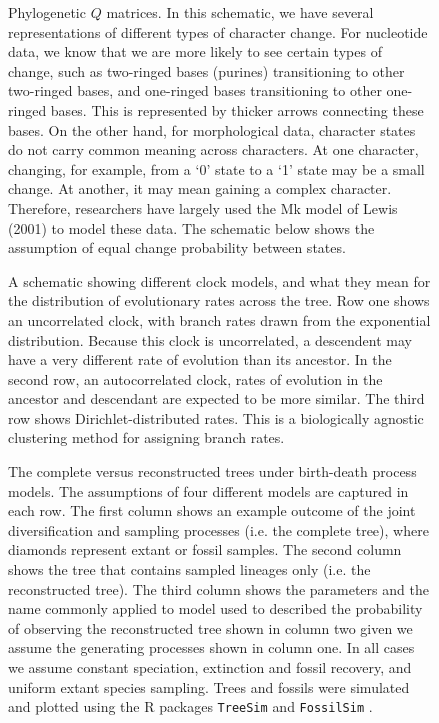 \documentclass{cup-elements}
\begin{document}
\begin{figure}[h!]
\centering
\caption{Phylogenetic $Q$ matrices.
In this schematic, we have several representations of different types of character change.
For nucleotide data, we know that we are more likely to see certain types of change, such as two-ringed bases (purines) transitioning to other two-ringed bases, and one-ringed bases transitioning to other one-ringed bases.
This is represented by thicker arrows connecting these bases.
On the other hand, for morphological data, character states do not carry common meaning across characters.
At one character, changing, for example, from a `0' state to a `1' state may be a small change.
At another, it may mean gaining a complex character.
Therefore, researchers have largely used the Mk model of Lewis (2001) to model these data.
The schematic below shows the assumption of equal change probability between states.
}
\label{fig:Q}
\end{figure}

\begin{figure}[h!]
\centering
\caption{A schematic showing different clock models, and what they mean for the distribution of evolutionary rates across the tree. Row one shows an uncorrelated clock, with branch rates drawn from the exponential distribution. Because this clock is uncorrelated, a descendent may have a very different rate of evolution than its ancestor. In the second row, an autocorrelated clock, rates of evolution in the ancestor and descendant are expected to be more similar. The third row shows Dirichlet-distributed rates. This is a biologically agnostic clustering method for assigning branch rates.
}
\label{fig:distn}
\end{figure}

\begin{figure}
\centering
\caption{The complete versus reconstructed trees under birth-death process models.
The assumptions of four different models are captured in each row.
The first column shows an example outcome of the joint diversification and sampling processes (i.e. the complete tree), where diamonds represent  extant or fossil samples.
The second column shows the tree that contains sampled lineages only (i.e. the reconstructed tree). 
The third column shows the parameters and the name commonly applied to model used to described the probability of observing the reconstructed tree shown in column two given we assume the generating processes shown in column one.
In all cases we assume constant speciation, extinction and fossil recovery, and uniform extant species sampling.
Trees and fossils were simulated and plotted using the R packages \texttt{TreeSim} \citep{Stadler2011} and \texttt{FossilSim} \citep{BaridoSottani2019b}.}
\label{fig:birth-death}
\end{figure}
\end{document}
